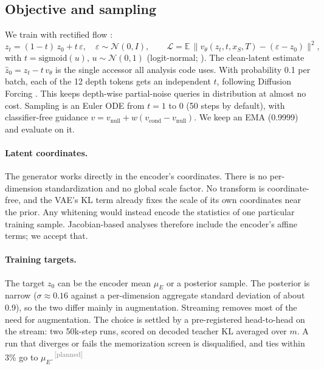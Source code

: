 \documentclass[11pt]{article}
\newcommand{\E}{\mathbb{E}}
\newcommand{\N}{\mathcal{N}}
\newcommand{\planned}{\textsuperscript{\textcolor{gray}{\,[planned]}}}
\begin{document}
\subsection{Objective and sampling}

We train with rectified flow \citep{liu2023rectified,lipman2023flow}:
\begin{equation}
  z_t = (1-t)\,z_0 + t\,\varepsilon,\quad \varepsilon\sim\N(0, I),\qquad
  \mathcal{L} = \E\,\big\lVert v_\theta(z_t, t, x_S, T) - (\varepsilon - z_0)\big\rVert^2,
\end{equation}
with $t = \mathrm{sigmoid}(u)$, $u\sim\N(0,1)$ (logit-normal; \citealp{esser2024sd3}). The clean-latent estimate
$\hat z_0 = z_t - t\,v_\theta$ is the single accessor all analysis code uses. With probability 0.1 per batch, each of the
12 depth tokens gets an independent $t$, following Diffusion Forcing \citep{chen2024diffusionforcing}. This keeps
depth-wise partial-noise queries in distribution at almost no cost. Sampling is an Euler ODE from $t=1$ to 0 (50 steps by
default), with classifier-free guidance $v = v_{\text{null}} + w(v_{\text{cond}} - v_{\text{null}})$. We keep an EMA
(0.9999) and evaluate on it.

\paragraph{Latent coordinates.} The generator works directly in the encoder's coordinates. There is no per-dimension
standardization and no global scale factor. No transform is coordinate-free, and the VAE's KL term already fixes the
scale of its own coordinates near the prior. Any whitening would instead encode the statistics of one particular
training sample. Jacobian-based analyses therefore include the encoder's affine terms; we accept that.

\paragraph{Training targets.} The target $z_0$ can be the encoder mean $\mu_E$ or a posterior sample. The posterior is
narrow ($\sigma \approx 0.16$ against a per-dimension aggregate standard deviation of about 0.9), so the two differ mainly
in augmentation. Streaming removes most of the need for augmentation. The choice is settled by a pre-registered
head-to-head on the stream: two 50k-step runs, scored on decoded teacher KL averaged over $m$. A run that diverges or fails
the memorization screen is disqualified, and ties within 3\% go to $\mu_E$.\planned
\end{document}
